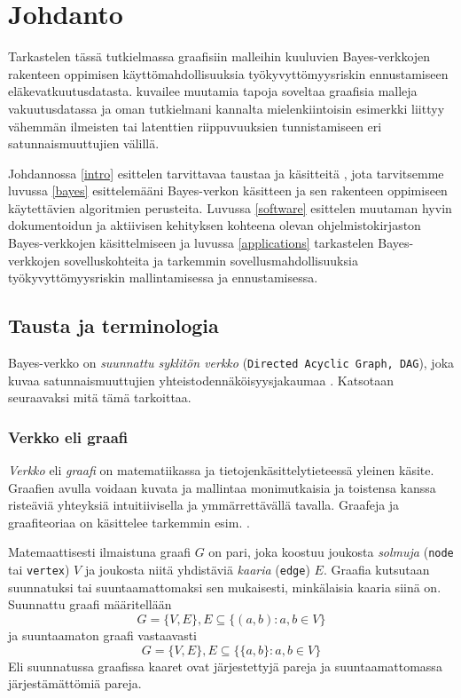 \chapter{Johdanto\label{intro}}

Tarkastelen tässä tutkielmassa graafisiin malleihin kuuluvien Bayes-verkkojen rakenteen oppimisen käyttömahdollisuuksia työkyvyttömyysriskin ennustamiseen eläkevatkuutusdatasta. \citet{ramsahai_connecting_2020} kuvailee muutamia tapoja soveltaa graafisia malleja vakuutusdatassa ja oman tutkielmani kannalta mielenkiintoisin esimerkki liittyy vähemmän ilmeisten tai latenttien riippuvuuksien tunnistamiseen eri satunnaismuuttujien välillä. 

Johdannossa \ref{intro} esittelen tarvittavaa taustaa ja käsitteitä , jota tarvitsemme luvussa \ref{bayes} esittelemääni Bayes-verkon käsitteen ja sen rakenteen oppimiseen käytettävien algoritmien perusteita. Luvussa \ref{software} esittelen muutaman hyvin dokumentoidun ja aktiivisen kehityksen kohteena olevan ohjelmistokirjaston Bayes-verkkojen käsittelmiseen ja luvussa \ref{applications} tarkastelen Bayes-verkkojen sovelluskohteita ja tarkemmin sovellusmahdollisuuksia työkyvyttömyysriskin mallintamisessa ja ennustamisessa.

\section{Tausta ja terminologia}
Bayes-verkko on \emph{suunnattu syklitön verkko} (\texttt{Directed Acyclic Graph, DAG}), joka kuvaa satunnaismuuttujien yhteistodennäköisyysjakaumaa \citep{ruggeri_bayesian_2008}. Katsotaan seuraavaksi mitä tämä tarkoittaa.

\subsection{Verkko eli graafi}
\emph{Verkko} eli \emph{graafi} on matematiikassa ja tietojenkäsittelytieteessä yleinen käsite. Graafien avulla voidaan  kuvata ja mallintaa monimutkaisia ja toistensa kanssa risteäviä yhteyksiä intuitiivisella ja ymmärrettävällä tavalla. Graafeja ja graafiteoriaa on käsittelee tarkemmin esim. \citet{diestel_graph_2017}.

Matemaattisesti ilmaistuna graafi $G$ on pari, joka koostuu joukosta \emph{solmuja} (\texttt{node} tai \texttt{vertex}) $V$ ja joukosta niitä yhdistäviä \emph{kaaria} (\texttt{edge}) $E$. Graafia kutsutaan suunnatuksi tai suuntaamattomaksi sen mukaisesti, minkälaisia kaaria siinä on. Suunnattu graafi määritellään 
$$
    G = \{V, E\}, E \subseteq \{(a,b) : a,b \in V \}
$$
ja suuntaamaton graafi vastaavasti
$$
    G = \{V, E\}, E \subseteq \{\{a,b\} : a,b \in V \}
$$
Eli suunnatussa graafissa kaaret ovat järjestettyjä pareja ja  suuntaamattomassa järjestämättömiä pareja.  


